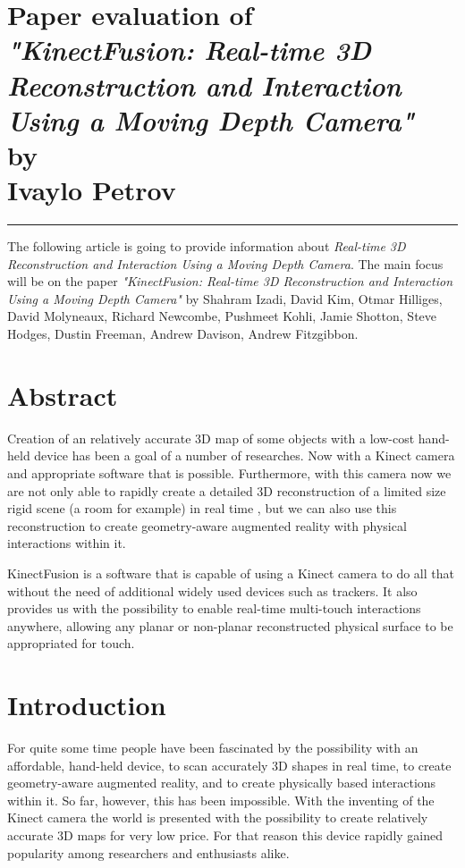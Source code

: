 \documentclass[11pt, a4paper]{article}
\newcommand{\hr}{\rule{\linewidth}{0.1mm}}
\theoremstyle{plain}
\begin{document}


\section*{\centering
  Paper evaluation of\\
  \emph{"KinectFusion: Real-time 3D Reconstruction and Interaction Using a
    Moving Depth Camera"}\\
  by\\
  Ivaylo Petrov
}

\hr

The following article is going to provide information about \emph{Real-time 3D
Reconstruction and Interaction Using a Moving Depth Camera}. The main focus 
will be on the paper \emph{"KinectFusion: Real-time 3D Reconstruction and
Interaction Using a Moving Depth Camera"} by Shahram Izadi, David Kim,
Otmar Hilliges, David Molyneaux, Richard Newcombe, Pushmeet Kohli,
Jamie Shotton, Steve Hodges, Dustin Freeman, Andrew Davison, Andrew Fitzgibbon.

\section{Abstract} %
\label{sec:Abstract}
  Creation of an relatively accurate 3D map of some objects with a low-cost 
  hand-held device has been a goal of a number of researches. Now with a Kinect
  camera and appropriate software that is possible. Furthermore, with this 
  camera now we are not only able to rapidly create a detailed 3D reconstruction
  of a limited size rigid scene (a room for example) in real time
  \cite{kinectfusion}, but we can also use this reconstruction to create
  geometry-aware augmented reality with physical interactions within it. 

  KinectFusion is a software that is capable of using a Kinect camera to do all
  that without the need of additional widely used devices such as trackers. It
  also provides us with the possibility to enable real-time multi-touch
  interactions anywhere, allowing any planar or non-planar reconstructed
  physical surface to be appropriated for touch.

\section{Introduction} %
\label{sec:Introduction}
  For quite some time people have been fascinated by the possibility with an 
  affordable, hand-held device, to scan accurately 3D shapes in real time,  
  to create geometry-aware augmented reality, and to create physically based
  interactions within it. So far, however, this has been impossible. With the
  inventing of the Kinect camera the world is presented with the possibility to
  create relatively accurate 3D maps for very low price. For that reason this
  device rapidly gained popularity among researchers and enthusiasts alike.
\end{document}
